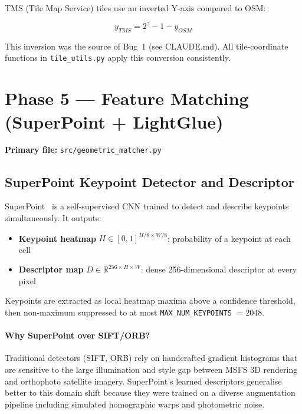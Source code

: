 \documentclass[12pt,a4paper]{article}
\newcommand{\R}{\mathbb{R}}
\begin{document}
TMS (Tile Map Service) tiles use an inverted Y-axis compared to OSM:

\begin{equation}
    y_{TMS} = 2^z - 1 - y_{OSM}
    \label{eq:tms_y}
\end{equation}

This inversion was the source of Bug~1 (see CLAUDE.md). All tile-coordinate
functions in \texttt{tile\_utils.py} apply this conversion consistently.

\section{Phase 5 --- Feature Matching (SuperPoint + LightGlue)}

\noindent\textbf{Primary file:} \texttt{src/geometric\_matcher.py}

\subsection{SuperPoint Keypoint Detector and Descriptor}

SuperPoint~\cite{detone2018} is a self-supervised CNN trained to detect and
describe keypoints simultaneously. It outputs:

\begin{itemize}
    \item \textbf{Keypoint heatmap} $H \in [0,1]^{H/8 \times W/8}$:
          probability of a keypoint at each cell
    \item \textbf{Descriptor map} $D \in \R^{256 \times H \times W}$:
          dense 256-dimensional descriptor at every pixel
\end{itemize}

Keypoints are extracted as local heatmap maxima above a confidence threshold,
then non-maximum suppressed to at most \texttt{MAX\_NUM\_KEYPOINTS} $= 2048$.

\paragraph{Why SuperPoint over SIFT/ORB?}
Traditional detectors (SIFT, ORB) rely on handcrafted gradient histograms that
are sensitive to the large illumination and style gap between MSFS 3D rendering
and orthophoto satellite imagery. SuperPoint's learned descriptors generalise
better to this domain shift because they were trained on a diverse augmentation
pipeline including simulated homographic warps and photometric noise.
\end{document}
